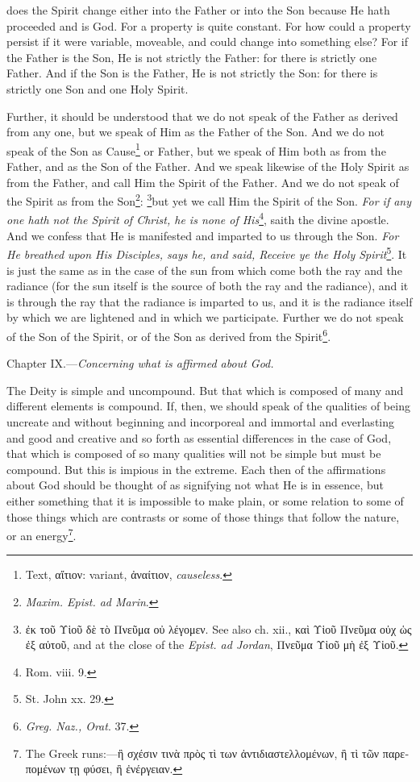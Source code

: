 does the Spirit change either into the Father or into the Son because He hath proceeded and is God. For a property is quite constant. For how could a property persist if it were variable, moveable, and could change into something else? For if the Father is the Son, He is not strictly the Father: for there is strictly one Father. And if the Son is the Father, He is not strictly the Son: for there is strictly one Son and one Holy Spirit.

Further, it should be understood that we do not speak of the Father as derived from any one, but we speak of Him as the Father of the Son. And we do not speak of the Son as Cause\footnote{Text, \textgreek{αἴτιον}: variant, \textgreek{ἀναίτιον}, \emph{causeless}.} or Father, but we speak of Him both as from the Father, and as the Son of the Father. And we speak likewise of the Holy Spirit as from the Father, and call Him the Spirit of the Father. And we do not speak of the Spirit as from the Son\footnote{\emph{Maxim. Epist. ad Marin}.}: \footnote{\textgreek{ἐκ τοῦ Υἱοῦ δὲ τὸ Πνεῦμα οὐ λέγομεν}. See also ch. xii., \textgreek{καὶ Υἱοῦ Πνεῦμα οὐχ ὡς ἐξ αὐτοῦ}, and at the close of the \emph{Epist. ad Jordan}, \textgreek{Πνεῦμα Υἱοῦ μὴ ἐξ Υἱοῦ}.}but yet we call Him the Spirit of the Son. \emph{For if any one hath not the Spirit of Christ, he is none of His}\footnote{Rom. viii. 9.}, saith the divine apostle. And we confess that He is manifested and imparted to us through the Son. \emph{For He breathed upon His Disciples, says he, and said, Receive ye the Holy Spirit}\footnote{St. John xx. 29.}. It is just the same as in the case of the sun from which come both the ray and the radiance (for the sun itself is the source of both the ray and the radiance), and it is through the ray that the radiance is imparted to us, and it is the radiance itself by which we are lightened and in which we participate. Further we do not speak of the Son of the Spirit, or of the Son as derived from the Spirit\footnote{\emph{Greg. Naz., Orat}. 37.}.


Chapter IX.—\emph{Concerning what is affirmed about God.}

The Deity is simple and uncompound. But that which is composed of many and different elements is compound. If, then, we should speak of the qualities of being uncreate and without beginning and incorporeal and immortal and everlasting and good and creative and so forth as essential differences in the case of God, that which is composed of so many qualities will not be simple but must be compound. But this is impious in the extreme. Each then of the affirmations about God should be thought of as signifying not what He is in essence, but either something that it is impossible to make plain, or some relation to some of those things which are contrasts or some of those things that follow the nature, or an energy\footnote{The Greek runs:—\textgreek{ἢ σχέσιν τινὰ πρὸς τὶ των ἀντιδιαστελλομένων, ἢ τὶ τῶν παρεπομένων τῃ φύσει, ἢ ἐνέργειαν}.}.

